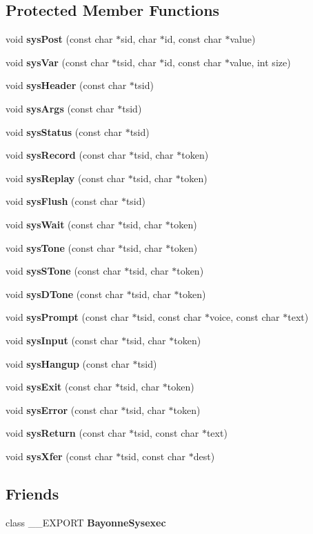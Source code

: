 \subsection*{Protected Member Functions}
\begin{DoxyCompactItemize}
\item 
void {\bf sysPost} (const char $\ast$sid, char $\ast$id, const char $\ast$value)
\item 
void {\bf sysVar} (const char $\ast$tsid, char $\ast$id, const char $\ast$value, int size)
\item 
void {\bf sysHeader} (const char $\ast$tsid)
\item 
void {\bf sysArgs} (const char $\ast$tsid)
\item 
void {\bf sysStatus} (const char $\ast$tsid)
\item 
void {\bf sysRecord} (const char $\ast$tsid, char $\ast$token)
\item 
void {\bf sysReplay} (const char $\ast$tsid, char $\ast$token)
\item 
void {\bf sysFlush} (const char $\ast$tsid)
\item 
void {\bf sysWait} (const char $\ast$tsid, char $\ast$token)
\item 
void {\bf sysTone} (const char $\ast$tsid, char $\ast$token)
\item 
void {\bf sysSTone} (const char $\ast$tsid, char $\ast$token)
\item 
void {\bf sysDTone} (const char $\ast$tsid, char $\ast$token)
\item 
void {\bf sysPrompt} (const char $\ast$tsid, const char $\ast$voice, const char $\ast$text)
\item 
void {\bf sysInput} (const char $\ast$tsid, char $\ast$token)
\item 
void {\bf sysHangup} (const char $\ast$tsid)
\item 
void {\bf sysExit} (const char $\ast$tsid, char $\ast$token)
\item 
void {\bf sysError} (const char $\ast$tsid, char $\ast$token)
\item 
void {\bf sysReturn} (const char $\ast$tsid, const char $\ast$text)
\item 
void {\bf sysXfer} (const char $\ast$tsid, const char $\ast$dest)
\end{DoxyCompactItemize}
\subsection*{Friends}
\begin{DoxyCompactItemize}
\item 
class \_\-\_\-EXPORT {\bf BayonneSysexec}
\end{DoxyCompactItemize}


